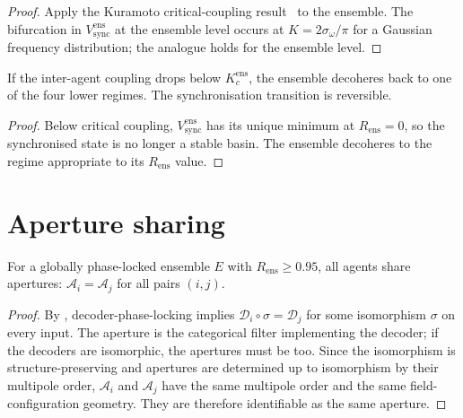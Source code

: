 \documentclass[11pt,twocolumn,a4paper]{article}
\newcommand{\D}{\mathcal{D}}
\newcommand{\Aper}{\mathcal{A}}
\newcommand{\Kc}{K_c}
\newcommand{\Ord}{R}
\begin{document}
\begin{proof}
Apply the Kuramoto critical-coupling result~\cite{kuramoto1975,
strogatz2000,acebron2005} to the ensemble. The bifurcation in
$V_{\mathrm{sync}}^{\mathrm{ens}}$ at the ensemble level occurs at
$K=2\sigma_\omega/\pi$ for a Gaussian frequency distribution; the
analogue holds for the ensemble level.
\end{proof}

\begin{corollary}\label{cor:reverse}
If the inter-agent coupling drops below $\Kc^{\mathrm{ens}}$, the
ensemble decoheres back to one of the four lower regimes. The
synchronisation transition is reversible.
\end{corollary}

\begin{proof}
Below critical coupling, $V_{\mathrm{sync}}^{\mathrm{ens}}$ has its
unique minimum at $\Ord_{\mathrm{ens}}=0$, so the synchronised state
is no longer a stable basin. The ensemble decoheres to the regime
appropriate to its $\Ord_{\mathrm{ens}}$ value.
\end{proof}

\section{Aperture sharing}
\label{sec:aperture-share}

\begin{theorem}\label{thm:aper-share}
For a globally phase-locked ensemble $E$ with $\Ord_{\mathrm{ens}}\ge 0.95$,
all agents share apertures: $\Aper_i=\Aper_j$ for all pairs $(i,j)$.
\end{theorem}

\begin{proof}
By , decoder-phase-locking implies
$\D_i\circ\sigma=\D_j$ for some isomorphism $\sigma$ on every input.
The aperture is the categorical filter implementing the decoder; if
the decoders are isomorphic, the apertures must be too. Since the
isomorphism is structure-preserving and apertures are determined up
to isomorphism by their multipole order, $\Aper_i$ and $\Aper_j$
have the same multipole order and the same field-configuration
geometry. They are therefore identifiable as the same aperture.
\end{proof}
\end{document}
